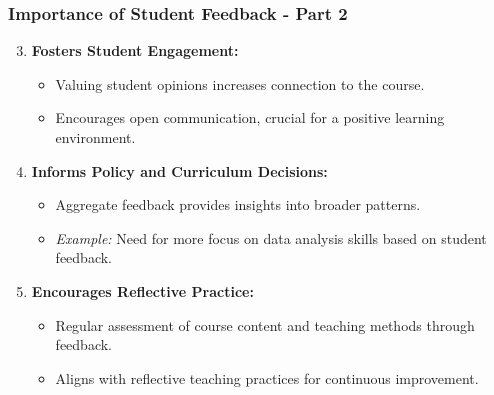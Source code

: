 \documentclass[aspectratio=169]{beamer}
\begin{document}
\begin{frame}[fragile]
    \frametitle{Importance of Student Feedback - Part 2}
    \begin{enumerate}
        \setcounter{enumi}{2}
        \item \textbf{Fosters Student Engagement:}
            \begin{itemize}
                \item Valuing student opinions increases connection to the course.
                \item Encourages open communication, crucial for a positive learning environment.
            \end{itemize}
        \item \textbf{Informs Policy and Curriculum Decisions:}
            \begin{itemize}
                \item Aggregate feedback provides insights into broader patterns.
                \item \textit{Example:} Need for more focus on data analysis skills based on student feedback.
            \end{itemize}
        \item \textbf{Encourages Reflective Practice:}
            \begin{itemize}
                \item Regular assessment of course content and teaching methods through feedback.
                \item Aligns with reflective teaching practices for continuous improvement.
            \end{itemize}
    \end{enumerate}
\end{frame}
\end{document}
